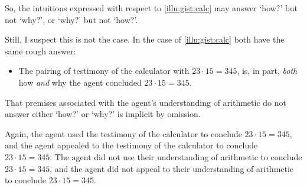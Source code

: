 \begin{note}
  So, the intuitions expressed with respect to \autoref{illu:gist:calc} may answer `how?' but not `why?', or `why?' but not `how?'.

  Still, I suspect this is not the case.
  In the case of \autoref{illu:gist:calc} both have the same rough answer:

  \begin{itemize}
  \item
    The pairing of testimony of the calculator with \(23 \cdot 15 = 345\), is, in part, \emph{both} how \emph{and} why the agent concluded \(23 \cdot 15 = 345\).
  \end{itemize}
  That premises associated with the agent's understanding of arithmetic do not answer either `how?' or `why?' is implicit by omission.

  Again, the agent used the testimony of the calculator to conclude \(23 \cdot 15 = 345\), and the agent appealed to the testimony of the calculator to conclude \(23 \cdot 15 = 345\).
  The agent did not use their understanding of arithmetic to conclude \(23 \cdot 15 = 345\), and the agent did not appeal to their understanding of arithmetic to conclude \(23 \cdot 15 = 345\).
\end{note}


